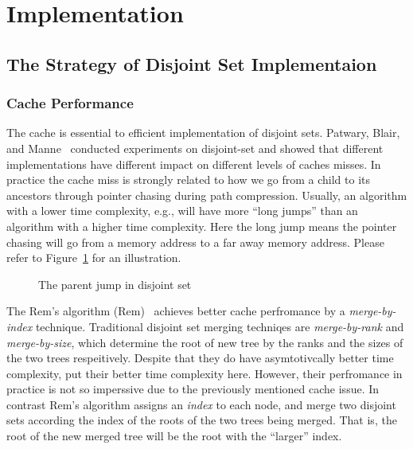 \section{Implementation} \label{sec:Implementation}

\subsection{The Strategy of Disjoint Set Implementaion}


\subsubsection{Cache Performance}

The cache is essential to efficient implementation of disjoint sets.
Patwary, Blair, and Manne~\cite{Patwary2010ExperimentsOU} conducted
experiments on disjoint-set and showed that different implementations
have different impact on different levels of caches misses.  In
practice the cache miss is strongly related to how we go from a child
to its ancestors through pointer chasing during path compression.
Usually, an algorithm with a lower time complexity, e.g.,  will have more
``long jumps'' than an algorithm with a higher time complexity.  Here
the long jump means the pointer chasing will go from a memory address
to a far away memory address.  Please refer to
Figure~\ref{fig:long-short-jump-disjoint} for an illustration.

\begin{figure}[!thb]
  \centering {} 
  \caption{The parent jump in disjoint set}
  \label{fig:long-short-jump-disjoint}
\end{figure}


The Rem's algorithm ({\sc Rem})~\cite{dijkstra1976a} achieves better
cache perfromance by a {\em merge-by-index} technique.  Traditional
disjoint set merging techniqes are {\em merge-by-rank}\cite{XXX} and
{\em merge-by-size}\cite{XXX}, which determine the root of new tree by
the ranks and the sizes of the two trees respeitively.  Despite that
they do have asymtotivcally better time complexity, put their better
time complexity here.  However, their perfromance in practice is not
so imperssive due to the previously mentioned cache issue.  In
contrast Rem's algorithm assigns an {\em index} to each node, and
merge two disjoint sets according the index of the roots of the two
trees being merged.  That is, the root of the new merged tree will be
the root with the ``larger'' index.


